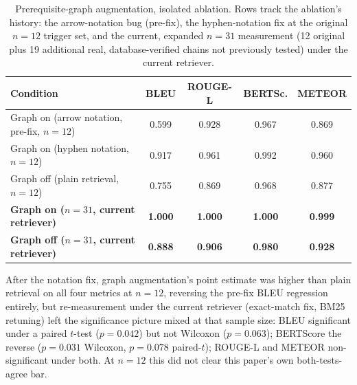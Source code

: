 \documentclass[a4paper,twoside]{article}
\begin{document}
\begin{table}[t]
\caption{Prerequisite-graph augmentation, isolated ablation. Rows track the ablation's history: the arrow-notation bug (pre-fix), the hyphen-notation fix at the original $n=12$ trigger set, and the current, expanded $n=31$ measurement (12 original plus 19 additional real, database-verified chains not previously tested) under the current retriever.}\label{tab:graph-ablation} \centering
\begin{tabular}{|l|c|c|c|c|}
\hline
Condition & BLEU & ROUGE-L & BERTSc. & METEOR \\
\hline
Graph on (arrow notation, pre-fix, $n{=}12$) & 0.599 & 0.928 & 0.967 & 0.869 \\
Graph on (hyphen notation, $n{=}12$) & 0.917 & 0.961 & 0.992 & 0.960 \\
Graph off (plain retrieval, $n{=}12$) & 0.755 & 0.869 & 0.968 & 0.877 \\
\textbf{Graph on ($n{=}31$, current retriever)} & \textbf{1.000} & \textbf{1.000} & \textbf{1.000} & \textbf{0.999} \\
\textbf{Graph off ($n{=}31$, current retriever)} & \textbf{0.888} & \textbf{0.906} & \textbf{0.980} & \textbf{0.928} \\
\hline
\end{tabular}
\end{table}

After the notation fix, graph augmentation's point estimate was higher than plain retrieval on all four metrics at $n=12$, reversing the pre-fix BLEU regression entirely, but re-measurement under the current retriever (exact-match fix, BM25 retuning) left the significance picture mixed at that sample size: BLEU significant under a paired $t$-test ($p=0.042$) but not Wilcoxon ($p=0.063$); BERTScore the reverse ($p=0.031$ Wilcoxon, $p=0.078$ paired-$t$); ROUGE-L and METEOR non-significant under both. At $n=12$ this did not clear this paper's own both-tests-agree bar.
\end{document}
